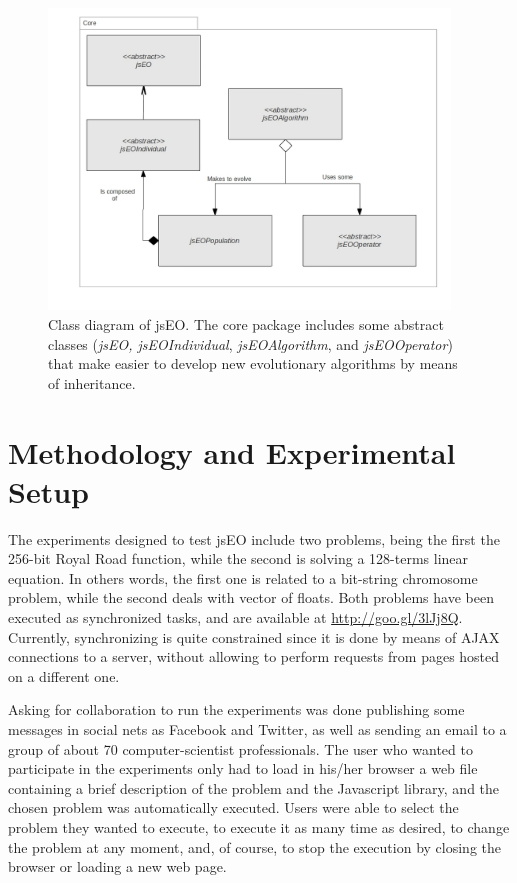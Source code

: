 \documentclass[runningheads,a4paper]{llncs}
\begin{document}
\begin{figure}
\centering
\includegraphics[height=8cm]{class-diagram}
\caption{Class diagram of jsEO. The core package includes some abstract classes (\textit{jsEO, jsEOIndividual}, \textit{jsEOAlgorithm}, and \textit{jsEOOperator}) that make easier to develop new evolutionary algorithms by means of inheritance.}
\label{fig:jsEO-class-diagram}
\end{figure}


\section{Methodology and Experimental Setup}
\label{sec:method}
The experiments designed to test jsEO include two problems, being the first the 256-bit Royal Road function, while the second is solving a 128-terms linear equation. In others words, the first one is related to a bit-string chromosome problem, while the second deals with vector of floats. Both problems have been executed as synchronized tasks, and are available at \url{http://goo.gl/3lJj8Q}. Currently, synchronizing is quite constrained since it is done by means of AJAX connections to a server, without allowing to perform requests from pages hosted on a different one. 

Asking for collaboration to run the experiments was done publishing some messages in social nets as Facebook and Twitter, as well as sending an email to a group of about 70 computer-scientist professionals. The user who wanted to participate in the experiments only had to load in his/her browser a web file containing a brief description of the problem and the Javascript library, and the chosen problem was automatically executed. Users were able to select the problem they wanted to execute, to execute it as many time as desired, to change the problem at any moment, and, of course, to stop the execution by closing the browser or loading a new web page.
\end{document}

